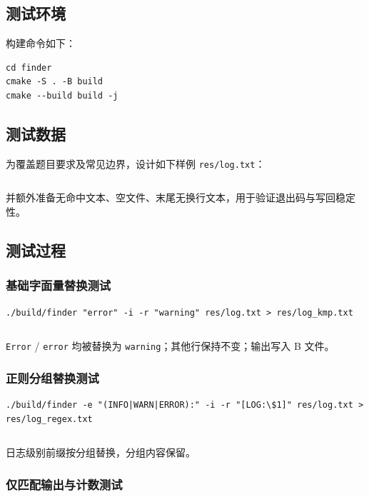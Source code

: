 \documentclass[12pt, a4paper]{ctexart}
\begin{document}
\subsection{测试环境}

构建命令如下：

\begin{verbatim}
cd finder
cmake -S . -B build
cmake --build build -j
\end{verbatim}

\subsection{测试数据}

为覆盖题目要求及常见边界，设计如下样例 \texttt{res/log.txt}：

\inputminted{text}{../res/log.txt}

并额外准备无命中文本、空文件、末尾无换行文本，用于验证退出码与写回稳定性。

\subsection{测试过程}

\subsubsection{基础字面量替换测试}

\begin{verbatim}
./build/finder "error" -i -r "warning" res/log.txt > res/log_kmp.txt
\end{verbatim}

\inputminted{text}{../res/log_kmp.txt}

\texttt{Error} / \texttt{error} 均被替换为 \texttt{warning}；其他行保持不变；输出写入 B 文件。

\subsubsection{正则分组替换测试}

\begin{verbatim}
./build/finder -e "(INFO|WARN|ERROR):" -i -r "[LOG:\$1]" res/log.txt > res/log_regex.txt
\end{verbatim}

\inputminted{text}{../res/log_regex.txt}

日志级别前缀按分组替换，分组内容保留。

\subsubsection{仅匹配输出与计数测试}
\end{document}
